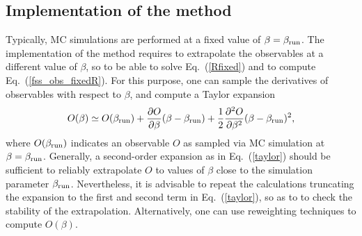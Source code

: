 \documentclass[pre,twocolumn]{revtex4-2}
\begin{document}
\subsection{Implementation of the method}
\label{sec:fss:implementation}
Typically, MC simulations are performed at a fixed value of $\beta=\beta_{\rm run}$.
The implementation of the method requires to extrapolate the observables at a different value of $\beta$, so to be able to solve Eq.~(\ref{Rfixed}) and to compute Eq.~(\ref{fss_obs_fixedR}).
For this purpose, one can sample the derivatives of observables with respect to $\beta$, and compute a Taylor expansion
\begin{equation}
  O(\beta) \simeq O(\beta_{\rm run}) + \frac{\partial O}{\partial\beta}(\beta-\beta_{\rm run}) + \frac{1}{2}\frac{\partial^2 O}{\partial\beta^2}(\beta-\beta_{\rm run})^2,
  \label{taylor}
\end{equation}
where $O(\beta_{\rm run})$ indicates an observable $O$ as sampled via MC simulation at $\beta=\beta_{\rm run}$.
Generally, a second-order expansion as in Eq.~(\ref{taylor}) should be sufficient to reliably extrapolate $O$ to values of $\beta$ close to the simulation parameter $\beta_{\rm run}$.
Nevertheless,
it is advisable to repeat the calculations truncating the expansion to the first and second term in Eq.~(\ref{taylor}), so as to to check the stability of the extrapolation.
Alternatively, one can use reweighting techniques to compute $O(\beta)$.
\end{document}
